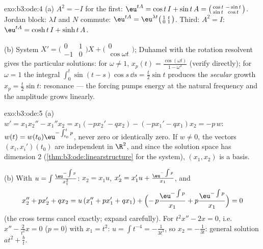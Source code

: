 \begin{solution}{exo:b3:ode:4}
(a) $A^2 = -I$ for the first: $\eu^{tA} = \cos t\,I + \sin
t\,A = \bigl(\begin{smallmatrix}\cos t & -\sin t\\ \sin t &
\cos t\end{smallmatrix}\bigr)$. Jordan block: $\lambda I$ and
$N$ commute: $\eu^{tA} =
\eu^{\lambda t}\bigl(\begin{smallmatrix}1 & t\\ 0 &
1\end{smallmatrix}\bigr)$. Third: $A^2 = I$: $\eu^{tA} =
\cosh t\,I + \sinh t\,A$.

(b) System $X' = \bigl(\begin{smallmatrix}0&1\\-1&0
\end{smallmatrix}\bigr)X + \bigl(\begin{smallmatrix}0\\
\cos\omega t\end{smallmatrix}\bigr)$; Duhamel with the
rotation resolvent gives the particular solutions: for
$\omega \neq 1$, $x_p(t) = \frac{\cos(\omega t)}{1 -
\omega^2}$ (verify directly); for $\omega = 1$ the integral
$\int_0^t\sin(t - s)\cos s\,\dd s = \frac t2\sin t$ produces
the \emph{secular} growth $x_p = \frac t2\sin t$: resonance
--- the forcing pumps energy at the natural frequency and the
amplitude grows linearly.
\end{solution}

\begin{solution}{exo:b3:ode:5}
(a) $w' = x_1x_2'' - x_1''x_2 = x_1(-px_2' - qx_2) - (-px_1'
- qx_1)x_2 = -p\,w$: $w(t) = w(t_0)\eu^{-\int_{t_0}^tp}$,
never zero or identically zero. If $w \neq 0$, the vectors
$(x_i, x_i')(t_0)$ are independent in $\R^2$, and since the
solution space has dimension $2$
(\cref{thm:b3:ode:linearstructure} for the system), $(x_1,
x_2)$ is a basis.

(b) With $u = \int\frac{\eu^{-\int p}}{x_1^2}$: $x_2 = x_1u$,
$x_2' = x_1'u + \frac{\eu^{-\int p}}{x_1}$, and
\[
x_2'' + px_2' + qx_2
= u\,(x_1'' + px_1' + qx_1) +
\Bigl(-\,p\frac{\eu^{-\int p}}{x_1} +
p\frac{\eu^{-\int p}}{x_1}\Bigr) = 0
\]
(the cross terms cancel exactly; expand carefully). For
$t^2x'' - 2x = 0$, i.e.\ $x'' - \frac2{t^2}x = 0$ ($p = 0$)
with $x_1 = t^2$: $u = \int t^{-4} = -\frac1{3t^3}$, so $x_2
= -\frac1{3t}$: general solution $at^2 + \frac bt$.
\end{solution}

